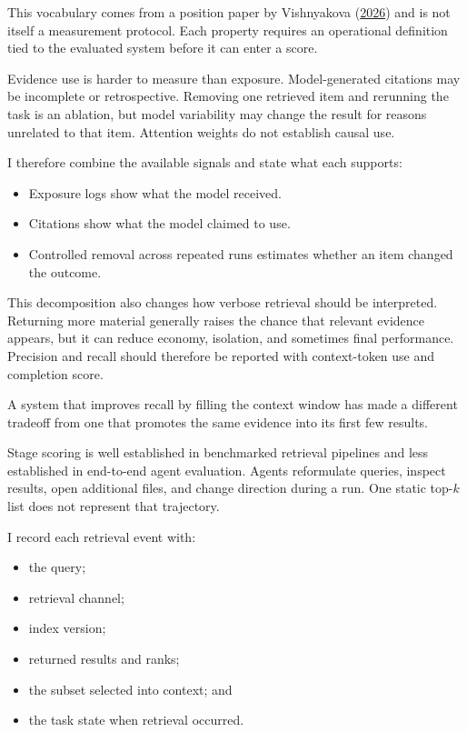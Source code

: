 This vocabulary comes from a position paper by Vishnyakova (\href{https://arxiv.org/abs/2603.09619}{2026}) and is not itself a measurement protocol. Each property requires an operational definition tied to the evaluated system before it can enter a score.

Evidence use is harder to measure than exposure. Model-generated citations may be incomplete or retrospective. Removing one retrieved item and rerunning the task is an ablation, but model variability may change the result for reasons unrelated to that item. Attention weights do not establish causal use.

I therefore combine the available signals and state what each supports:

\begin{itemize}
\tightlist
\item
  Exposure logs show what the model received.
\item
  Citations show what the model claimed to use.
\item
  Controlled removal across repeated runs estimates whether an item changed the outcome.
\end{itemize}

This decomposition also changes how verbose retrieval should be interpreted. Returning more material generally raises the chance that relevant evidence appears, but it can reduce economy, isolation, and sometimes final performance. Precision and recall should therefore be reported with context-token use and completion score.

A system that improves recall by filling the context window has made a different tradeoff from one that promotes the same evidence into its first few results.

Stage scoring is well established in benchmarked retrieval pipelines and less established in end-to-end agent evaluation. Agents reformulate queries, inspect results, open additional files, and change direction during a run. One static top-\(k\) list does not represent that trajectory.

I record each retrieval event with:

\begin{itemize}
\tightlist
\item
  the query;
\item
  retrieval channel;
\item
  index version;
\item
  returned results and ranks;
\item
  the subset selected into context; and
\item
  the task state when retrieval occurred.
\end{itemize}


